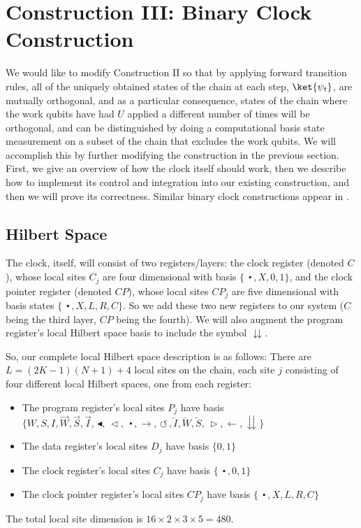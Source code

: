 \documentclass[11pt,letterpaper]{article}
\newcommand{\<}{\langle}
\renewcommand{\>}{\rangle}
\newcommand{\tur}{\,\circlearrowleft\,}   %
\newcommand{\gat}{\,\blacktriangleleft}  %
\newcommand{\mov}{\,\vartriangleleft}    %
\newcommand{\rmov}{\,\vartriangleright}
\newcommand{\bul}{\:\:\centerdot\:}       %
\newcommand{\li}{\overleftarrow{I}}
\newcommand{\lw}{\overleftarrow{W}}
\newcommand{\ls}{\overleftarrow{S}}
\begin{document}
\section{Construction III: Binary Clock Construction}\label{coniii}

We would like to modify Construction II so that by applying forward transition rules, all of the uniquely obtained states of the chain at each step, $\ket{\psi_t}$, are mutually orthogonal, and as a particular consequence, states of the chain where the work qubits have had $U$ applied a different number of times will be orthogonal, and can be distinguished by doing a computational basis state measurement on a subset of the chain that excludes the work qubits. We will accomplish this by further modifying the construction in the previous section. First, we give an overview of how the clock itself should work, then we describe how to implement its control and integration into our existing construction, and then we will prove its correctness. Similar binary clock constructions appear in \cite{AGIK,GI,CPGW}.

\subsection{Hilbert Space}

The clock, itself, will consist of two registers/layers: the clock register (denoted $C$), whose local sites $C_j$ are four dimensional with basis $\{\bul,X,0,1\}$, and the clock pointer register (denoted $CP$), whose local sites $CP_j$ are five dimensional with basis states $\{\bul,X,L,R,C\}$. So we add these two new registers to our system ($C$ being the third layer, $CP$ being the fourth). We will also augment the program register's local Hilbert space basis to include the symbol $\downdownarrows$.

So, our complete local Hilbert space description is as follows: There are $L=(2K-1)(N+1)+4$ local sites on the chain, each site $j$ consisting of four different local Hilbert spaces, one from each register:
\begin{itemize}
	\item The program register's local sites $P_j$ have basis $\{W,S,I,\overrightarrow{W},\overrightarrow{S},\overrightarrow{I},\gat,\mov,\bul,\rightarrow,\tur,\li,\lw,\ls,\rmov,\leftarrow,\downdownarrows\}$
	\item The data register's local sites $D_j$ have basis $\{0,1\}$
	\item The clock register's local sites $C_j$ have basis $\{\bul,0,1\}$
	\item The clock pointer register's local sites $CP_j$ have basis $\{\bul,X,L,R,C\}$
\end{itemize}
The total local site dimension is $16\times 2\times 3\times 5=480$.
\end{document}
